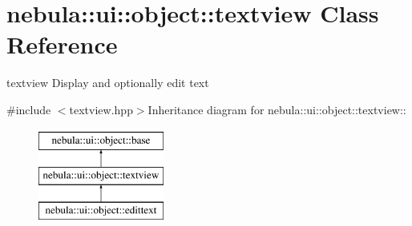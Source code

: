 \hypertarget{classnebula_1_1ui_1_1object_1_1textview}{
\section{nebula::ui::object::textview Class Reference}
\label{classnebula_1_1ui_1_1object_1_1textview}
}


textview Display and optionally edit text  


{\ttfamily \#include $<$textview.hpp$>$}Inheritance diagram for nebula::ui::object::textview::\begin{figure}[H]
\begin{center}
\leavevmode
\includegraphics[height=3cm]{classnebula_1_1ui_1_1object_1_1textview}
\end{center}
\end{figure}
